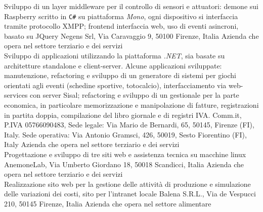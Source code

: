 \documentclass[totpages,openbib,italian]{europecv}
\begin{document}
\begin{europecv}
{Sviluppo di un layer middleware per il controllo di sensori e 
    attuatori: demone sui Raspberry scritto in \texttt{C\#} su
    piattaforma \emph{Mono}, ogni dispositivo si interfaccia
    tramite protocollo XMPP; frontend interfaccia web, uso di 
    eventi asincroni, basato su JQuery}
{Negens Srl, Via Caravaggio 9, 50100 Firenze, Italia}
{Azienda che opera nel settore terziario e dei servizi}
\\
{Sviluppo di applicazioni utilizzando la piattaforma \emph{.NET}, 
  sia basate su architetture standalone e client-server. Alcune applicazioni
  sviluppate: manutenzione, refactoring e sviluppo di un generatore di sistemi
  per giochi orientati agli eventi (schedine sportive, totocalcio), interfacciamento
  via web-services con server Sisal; refactoring e sviluppo di un gestionale 
  per la parte economica, in particolare memorizzazione e manipolazione
  di fatture, registrazioni in partita doppia, compilazione del libro giornale
  e di registri IVA.}
{Comm.it, P.IVA 05766090483, Sede legale: Via Mario de Bernardi, 65,
  50145, Firenze (FI), Italy. Sede operativa: Via Antonio Gramsci,
  426,
  50019, Sesto Fiorentino (FI), Italy }
{Azienda che opera nel settore terziario e dei servizi}
\\
{Progettazione e sviluppo di tre siti web e assistenza tecnica su
  macchine linux}
{AnemoneLab, Via Umberto Giordano 18, 50018 Scandicci, Italia}
{Azienda che opera nel settore terziario e dei servizi}
\\
{Realizzazione sito web per la gestione delle attivit\`a di produzione
  e simulazione delle variazioni dei costi, sito per l'intranet locale}
{Balena S.R.L., Via de Vespucci 210, 50145 Firenze, Italia}
{Azienda che opera nel settore alimentare}

\end{europecv}
\end{document}
